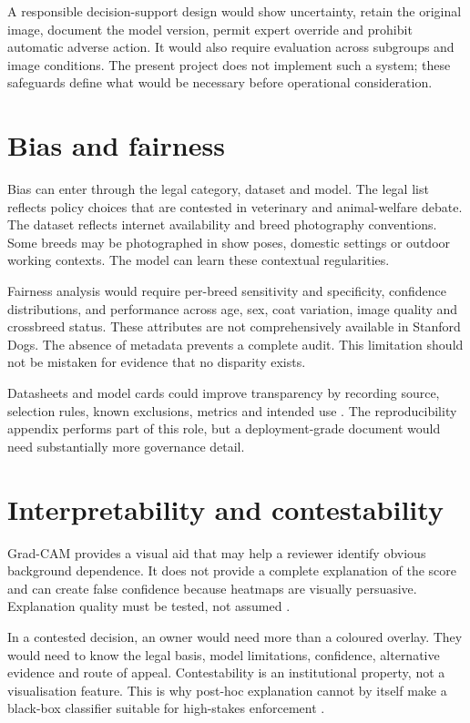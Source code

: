 A responsible decision-support design would show uncertainty, retain the original image, document the model version, permit expert override and prohibit automatic adverse action. It would also require evaluation across subgroups and image conditions. The present project does not implement such a system; these safeguards define what would be necessary before operational consideration.

\section{Bias and fairness}
Bias can enter through the legal category, dataset and model. The legal list reflects policy choices that are contested in veterinary and animal-welfare debate. The dataset reflects internet availability and breed photography conventions. Some breeds may be photographed in show poses, domestic settings or outdoor working contexts. The model can learn these contextual regularities.

Fairness analysis would require per-breed sensitivity and specificity, confidence distributions, and performance across age, sex, coat variation, image quality and crossbreed status. These attributes are not comprehensively available in Stanford Dogs. The absence of metadata prevents a complete audit. This limitation should not be mistaken for evidence that no disparity exists.

Datasheets and model cards could improve transparency by recording source, selection rules, known exclusions, metrics and intended use \citep{gebru2021datasheets,mitchell2019modelcards}. The reproducibility appendix performs part of this role, but a deployment-grade document would need substantially more governance detail.

\section{Interpretability and contestability}
Grad-CAM provides a visual aid that may help a reviewer identify obvious background dependence. It does not provide a complete explanation of the score and can create false confidence because heatmaps are visually persuasive. Explanation quality must be tested, not assumed \citep{adebayo2018sanity,samek2021explaining}.

In a contested decision, an owner would need more than a coloured overlay. They would need to know the legal basis, model limitations, confidence, alternative evidence and route of appeal. Contestability is an institutional property, not a visualisation feature. This is why post-hoc explanation cannot by itself make a black-box classifier suitable for high-stakes enforcement \citep{rudin2019stop}.

